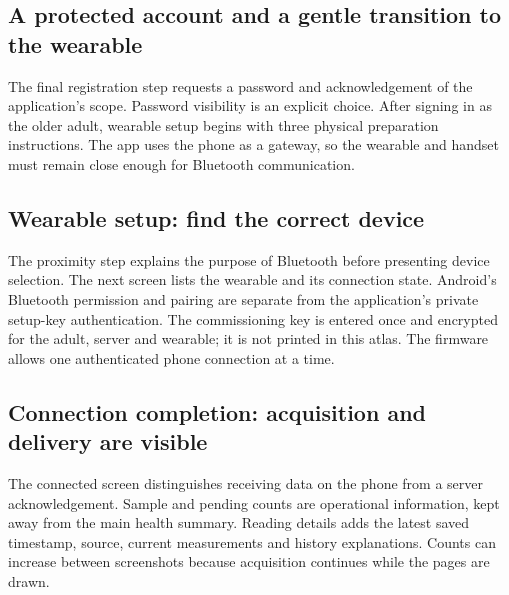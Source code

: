 \clearpage
\subsection{A protected account and a gentle transition to the wearable}
The final registration step requests a password and acknowledgement of the application's scope. Password visibility is an explicit choice. After signing in as the older adult, wearable setup begins with three physical preparation instructions. The app uses the phone as a gateway, so the wearable and handset must remain close enough for Bluetooth communication.


\clearpage
\subsection{Wearable setup: find the correct device}
The proximity step explains the purpose of Bluetooth before presenting device selection. The next screen lists the wearable and its connection state. Android's Bluetooth permission and pairing are separate from the application's private setup-key authentication. The commissioning key is entered once and encrypted for the adult, server and wearable; it is not printed in this atlas. The firmware allows one authenticated phone connection at a time.


\clearpage
\subsection{Connection completion: acquisition and delivery are visible}
The connected screen distinguishes receiving data on the phone from a server acknowledgement. Sample and pending counts are operational information, kept away from the main health summary. Reading details adds the latest saved timestamp, source, current measurements and history explanations. Counts can increase between screenshots because acquisition continues while the pages are drawn.

